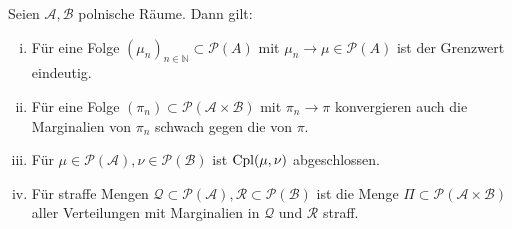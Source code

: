 \begin{lemma}\label{thm:closed_couplings}
Seien $\mathcal{A,B}$ polnische Räume. Dann gilt: 
\begin{enumerate}[(i)]
    \item Für eine Folge $(\mu_n)_{n\in \mathbb{N}} \subset\mathcal{P}(A)$ mit $\mu_n \rightarrow \mu \in \mathcal{P}(A)$ ist der Grenzwert eindeutig.
    \item Für eine Folge $(\pi_n) \subset \mathcal{P}(\mathcal{A} \times \mathcal{B})$ mit $\pi_n \rightarrow \pi$ konvergieren auch die Marginalien von $\pi_n$ schwach gegen die von $\pi$. 
    \item Für $\mu \in \mathcal{P}(\mathcal{A}), \nu \in \mathcal{P}(\mathcal{B})$ ist $\operatorname{Cpl}(\mu, \nu)$ abgeschlossen.
    \item Für straffe Mengen $\mathcal{Q}\subset \mathcal{P}(\mathcal{A}), \mathcal{R}\subset \mathcal{P}(\mathcal{B})$ ist die Menge $\Pi\subset \mathcal{P}(\mathcal{A}\times\mathcal{B})$ aller Verteilungen mit Marginalien in $\mathcal{Q}$ und $\mathcal{R}$ straff.
\end{enumerate}
\end{lemma}
